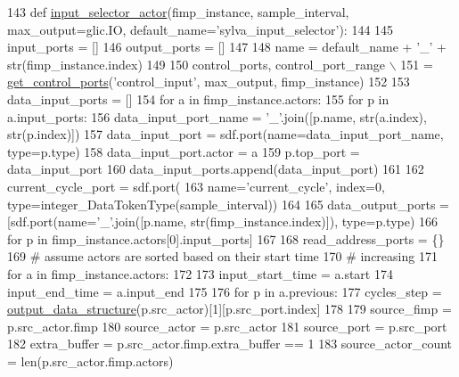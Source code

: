 \begin{DoxyCode}
143 \textcolor{keyword}{def }\hyperlink{namespacesylva_1_1code__generation_1_1air_aaa165d9fb26a2af721734a446b1549fa}{input\_selector\_actor}(fimp\_instance, sample\_interval, max\_output=glic.IO, 
      default\_name='sylva\_input\_selector'):
144 
145     input\_ports = []
146     output\_ports = []
147 
148     name = default\_name + \textcolor{stringliteral}{'\_'} + str(fimp\_instance.index)
149 
150     control\_ports, control\_port\_range \(\backslash\)
151         = \hyperlink{namespacesylva_1_1code__generation_1_1air_a71d379169f113b29c326aa9f70c6d47e}{get\_control\_ports}(\textcolor{stringliteral}{'control\_input'}, max\_output, fimp\_instance)
152 
153     data\_input\_ports = []
154     \textcolor{keywordflow}{for} a \textcolor{keywordflow}{in} fimp\_instance.actors:
155         \textcolor{keywordflow}{for} p \textcolor{keywordflow}{in} a.input\_ports:
156             data\_input\_port\_name = \textcolor{stringliteral}{'\_'}.join([p.name, str(a.index), str(p.index)])
157             data\_input\_port = sdf.port(name=data\_input\_port\_name, type=p.type)
158             data\_input\_port.actor = a
159             p.top\_port = data\_input\_port
160             data\_input\_ports.append(data\_input\_port)
161 
162     current\_cycle\_port = sdf.port(
163         name=\textcolor{stringliteral}{'current\_cycle'}, index=0, type=integer\_DataTokenType(sample\_interval))
164 
165     data\_output\_ports = [sdf.port(name=\textcolor{stringliteral}{'\_'}.join([p.name, str(fimp\_instance.index)]), type=p.type)
166                          \textcolor{keywordflow}{for} p \textcolor{keywordflow}{in} fimp\_instance.actors[0].input\_ports]
167 
168     read\_address\_ports = \{\}
169     \textcolor{comment}{# assume actors are sorted based on their start time}
170     \textcolor{comment}{# increasing}
171     \textcolor{keywordflow}{for} a \textcolor{keywordflow}{in} fimp\_instance.actors:
172 
173         input\_start\_time = a.start
174         input\_end\_time = a.input\_end
175 
176         \textcolor{keywordflow}{for} p \textcolor{keywordflow}{in} a.previous:
177             cycles\_step = \hyperlink{namespacesylva_1_1code__generation_1_1air_a83186b3b999778cee36ac81d42b2cd44}{output\_data\_structure}(p.src\_actor)[1][p.src\_port.index]
178 
179             source\_fimp = p.src\_actor.fimp
180             source\_actor = p.src\_actor
181             source\_port = p.src\_port
182             extra\_buffer = p.src\_actor.fimp.extra\_buffer == 1
183             source\_actor\_count = len(p.src\_actor.fimp.actors)

\end{DoxyCode}
